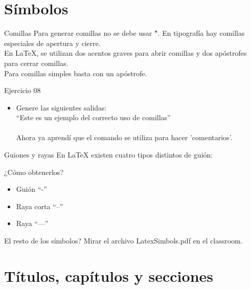 \section{S\'imbolos}

    \begin{frame}{Comillas}
        Para generar comillas no se debe usar \textbf{"}. En tipograf\'ia hay comillas especiales de apertura y cierre.\\
        En \LaTeX{}, se utilizan dos acentos graves para abrir comillas y dos ap\'ostrofes para cerrar comillas. \\
        Para comillas simples basta con un ap\'ostrofe.

        \begin{exampleblock}{Ejercicio 08}
            \begin{itemize}
                \item Genere las siguientes salidas: \\
                    ``Este es un ejemplo del correcto uso de comillas'' \\
                    \\
                    Ahora ya aprend\'i que el comando  se utiliza para hacer 'comentarios'. 	
             \end{itemize}
        \end{exampleblock}
    \end{frame}

    \begin{frame}{Guiones y rayas}
        En \LaTeX{} existen cuatro tipos distintos de gui\'on:

        \begin{block}{¿Cómo obtenerlos?}
            \begin{itemize}
                \item Guión ``-''
                \item Raya corta ``--''
                \item Raya ``---''
            \end{itemize}

        \end{block}
        El resto de los s\'imbolos? Mirar el archivo LatexSimbols.pdf en el classroom.
    \end{frame}

    \section{T\'itulos, cap\'itulos y secciones}

